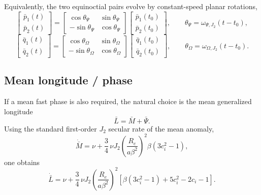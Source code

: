 \documentclass[11pt]{article}
\begin{document}
Equivalently, the two equinoctial pairs evolve by constant-speed planar
rotations,
\begin{equation}
\begin{bmatrix}
\bar p_1(t) \\
\bar p_2(t)
\end{bmatrix}
=
\begin{bmatrix}
\cos\theta_\Psi & \sin\theta_\Psi \\
-\sin\theta_\Psi & \cos\theta_\Psi
\end{bmatrix}
\begin{bmatrix}
\bar p_1(t_0) \\
\bar p_2(t_0)
\end{bmatrix},
\qquad
\theta_\Psi = \omega_{\Psi,J_2}(t-t_0),
\end{equation}
\begin{equation}
\begin{bmatrix}
\bar q_1(t) \\
\bar q_2(t)
\end{bmatrix}
=
\begin{bmatrix}
\cos\theta_\Omega & \sin\theta_\Omega \\
-\sin\theta_\Omega & \cos\theta_\Omega
\end{bmatrix}
\begin{bmatrix}
\bar q_1(t_0) \\
\bar q_2(t_0)
\end{bmatrix},
\qquad
\theta_\Omega = \omega_{\Omega,J_2}(t-t_0).
\end{equation}

\subsection{Mean longitude / phase}

If a mean fast phase is also required, the natural choice is the mean
generalized longitude
\begin{equation}
\bar L = \bar M + \bar\Psi.
\end{equation}
Using the standard first-order $J_2$ secular rate of the mean anomaly,
\begin{equation}
\dot{\bar M}
= \nu
+ \frac{3}{4}\,\nu J_2
\left(\frac{R_e}{a\beta^2}\right)^2
\beta\left(3c_i^2-1\right),
\end{equation}
one obtains
\begin{equation}
\dot{\bar L}
= \nu
+ \frac{3}{4}\,\nu J_2
\left(\frac{R_e}{a\beta^2}\right)^2
\left[
\beta(3c_i^2-1)
+ 5c_i^2 - 2c_i - 1
\right].
\label{eq:Lbar_J2}
\end{equation}
\end{document}
